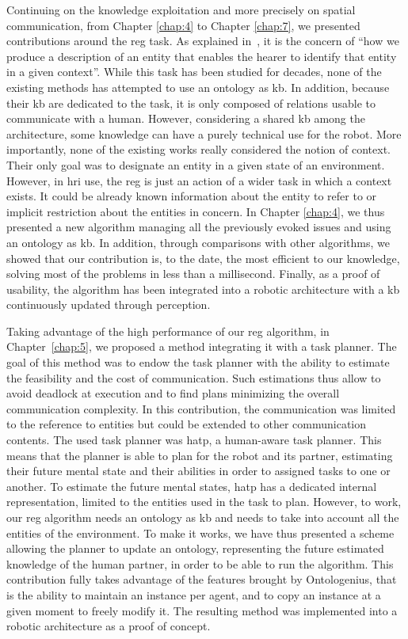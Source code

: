 Continuing on the knowledge exploitation and more precisely on spatial communication, from Chapter \ref{chap:4} to Chapter \ref{chap:7}, we presented contributions around the \acrfull{reg} task. As explained in~\cite{reiter_2000_building}, it is the concern of ``how we produce a description of an entity that enables the hearer to identify that entity in a given context''. While this task has been studied for decades, none of the existing methods has attempted to use an ontology as \acrshort{kb}. In addition, because their \acrshort{kb} are dedicated to the task, it is only composed of relations usable to communicate with a human. However, considering a shared \acrshort{kb} among the architecture, some knowledge can have a purely technical use for the robot. More importantly, none of the existing works really considered the notion of context. Their only goal was to designate an entity in a given state of an environment. However, in \acrshort{hri} use, the \acrshort{reg} is just an action of a wider task in which a context exists. It could be already known information about the entity to refer to or implicit restriction about the entities in concern. In Chapter \ref{chap:4}, we thus presented a new algorithm managing all the previously evoked issues and using an ontology as \acrshort{kb}. In addition, through comparisons with other algorithms, we showed that our contribution is, to the date, the most efficient to our knowledge, solving most of the problems in less than a millisecond. Finally, as a proof of usability, the algorithm has been integrated into a robotic architecture with a \acrshort{kb} continuously updated through perception.

Taking advantage of the high performance of our \acrshort{reg} algorithm, in Chapter~\ref{chap:5}, we proposed a method integrating it with a task planner. The goal of this method was to endow the task planner with the ability to estimate the feasibility and the cost of communication. Such estimations thus allow to avoid deadlock at execution and to find plans minimizing the overall communication complexity. In this contribution, the communication was limited to the reference to entities but could be extended to other communication contents. The used task planner was \acrshort{hatp}, a human-aware task planner. This means that the planner is able to plan for the robot and its partner, estimating their future mental state and their abilities in order to assigned tasks to one or another. To estimate the future mental states, \acrshort{hatp} has a dedicated internal representation, limited to the entities used in the task to plan. However, to work, our \acrshort{reg} algorithm needs an ontology as \acrshort{kb} and needs to take into account all the entities of the environment. To make it works, we have thus presented a scheme allowing the planner to update an ontology, representing the future estimated knowledge of the human partner, in order to be able to run the algorithm. This contribution fully takes advantage of the features brought by Ontologenius, that is the ability to maintain an instance per agent, and to copy an instance at a given moment to freely modify it. The resulting method was implemented into a robotic architecture as a proof of concept.

